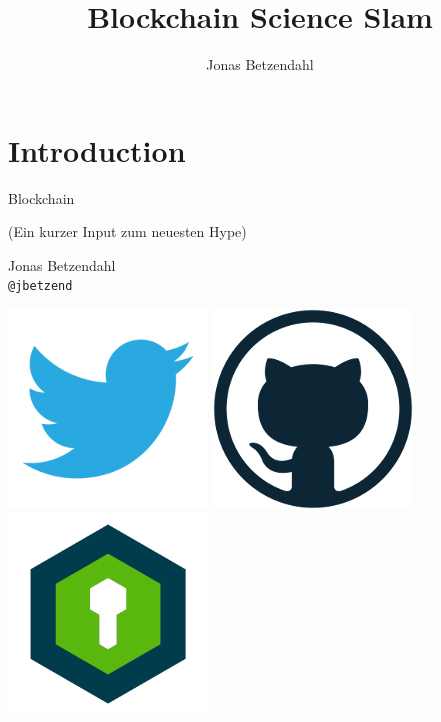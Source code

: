 \documentclass[aspectratio=169,x11names]{beamer}
\author{Jonas Betzendahl}
\title{Blockchain Science Slam}
\begin{document}
\section{Introduction}

\begin{frame}
\begin{center}
\Large \glqq Blockchain\grqq
\normalsize 

(Ein kurzer Input zum neuesten Hype)
\bigskip\bigskip

\Large Jonas Betzendahl\\
\texttt{@jbetzend}
\smallskip

\href{https://twitter.com/jbetzend}{\includegraphics[scale=0.125]{images/twitter_logo.png}}
\href{https://github.com/jbetzend}{\includegraphics[scale=0.125]{images/github_logo.png}}
\href{https://whispeer.de/en/user/jbetzend}{\includegraphics[scale=0.125]{images/whispeer_logo.png}}
\end{center}
\end{frame}
\end{document}
